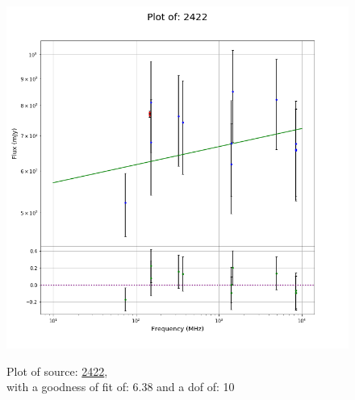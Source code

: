\documentclass{article}
\begin{document}
\begin{figure}[H]
\begin{minipage}{0.5\textwidth}
        \includegraphics[scale = 0.35]{KmeulenTrap4P23_1hr/1hr2422.png}
        \captionsetup{labelformat=empty}
        \caption{Plot of source: \href{http://banana.transientskp.org/r4/vlo_KmeulenTrap4P23/runningcatalog/2422}{2422},\\with a goodness of fit of: 6.38 and a dof of: 10}
    \addtocounter{figure}{-1}
    \label{KmeulenTrap4P23:1hr:2422:plot}
    \end{minipage}
\end{figure}
\end{document}

